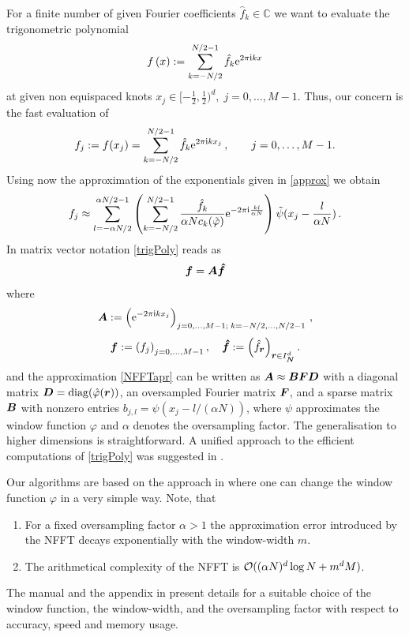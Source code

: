 \documentclass[journal]{IEEEtran}
\def\ti{\mbox{\scriptsize{\rm i}}}
\newcommand{\eip}[1]{{\rm e}^{ 2\pi{\ti} #1}}
\newcommand{\eim}[1]{{\rm e}^{-2\pi{\ti} #1}}
\newcommand{\zb}[1]{\mbox{\boldmath{${#1}$}}}
\newcommand{\zbs}[1]{\mbox{\boldmath\scriptsize{${#1}$}}}
\newcommand{\zbss}[1]{\mbox{\boldmath\tiny{${#1}$}}}
\newcommand{\diag}{{\rm diag}}
\numberwithin{equation}{section}
\numberwithin{table}{section}
\numberwithin{figure}{section}
\begin{document}
For a finite number of  
given Fourier coefficients $\hat f_{k} \in \mathbb{C}$
we want to
evaluate the trigonometric polynomial  
\begin{equation}
 \label{trigPoly}
  f\left( x\right) := \sum_{k=-N/2}^{N/2-1} \hat{f}_{k} \eip{ k x}
\end{equation}
at given non equispaced knots $ x_j \in
[-\frac{1}{2},\frac{1}{2})^d,\;j=0,\hdots,M-1$. 
Thus, our concern is the fast evaluation of
\begin{equation*}
 f_j :=f(x_j) = \sum_{k=-N/2}^{N/2-1} \hat{f}_{k} \eip{k x_j}\,, \qquad
 j=0,\hdots,M-1. 
\end{equation*}
Using now the approximation of the exponentials given in \eqref{approx}
we obtain
\begin{equation}
 \label{NFFTapr}
f_j \approx\sum_{l=-\alpha N/2}^{\alpha N/2-1}\left(
\sum_{ k=-N/2}^{N/2-1} \frac{\hat{f}_{k}}{\alpha N c_{k} (\tilde \varphi )}
\eim{\frac{kl}{\alpha N}}
\right)\tilde\psi (x_j-\frac{l}{\alpha N})  \, .
\end{equation}
In matrix vector notation \eqref{trigPoly} reads as
\begin{equation}
 \label{ndft}
 \zb f=\zb A \zb {\hat f}
\end{equation}
where 
\begin{equation*}
\zb A:=\left(\eim{k x_j}\right)_{j=0,\hdots,M-1;\;k=-N/2,\ldots,N/2-1}\, ,
\end{equation*}
\begin{equation*}
\zb f:=\left(f_j\right)_{j=0,\hdots,M-1},\quad 
\zb {\hat f}:=\left(\hat{f}_{\zbs r}\right)_{\zbs r\in I_{\zbss N}^d}.
\end{equation*}
and the approximation \eqref{NFFTapr} 
can be written as 
$\zb A \approx \zb B \zb F \zb D$ with a diagonal matrix $\zb
D=\diag(\hat \varphi(\zb r))$,
an oversampled Fourier matrix $\zb F$, and
a sparse matrix $\zb B$
with nonzero entries $b_{j,l}=\psi (x_j - l/ (\alpha N))$, where
$\psi$ approximates the window  function $\varphi$ and $\alpha$
denotes the oversampling factor. The generalisation to higher
dimensions is straightforward. A unified approach to the
efficient computations of \eqref{trigPoly} was suggested in \cite{st97,
  postta01}. 


Our algorithms are based on the approach in \cite{postta01} where one can change 
the window function $\varphi$ in a very simple way. Note, that
\begin{enumerate}
\item For a fixed oversampling factor $\alpha >1$ the approximation error introduced by the NFFT
decays exponentially with the window-width $m$.
\item The arithmetical complexity of the NFFT is ${\cal O} ((\alpha N)^d\log N+m^d M)$. 
\end{enumerate}
The manual \cite{kupo04b} and the appendix in \cite{post02} present details
for a suitable choice of the window function, the window-width, and the
oversampling factor with respect to accuracy, speed and memory usage.
\end{document}
